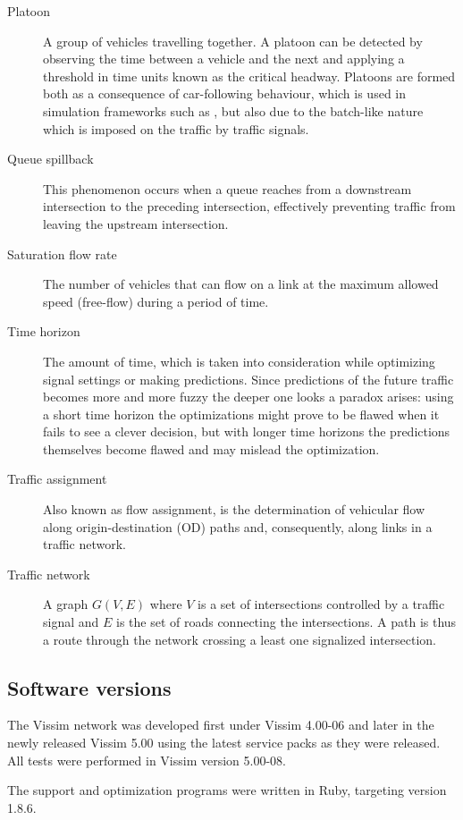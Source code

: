 \begin{description}
	\item[Platoon] A group of vehicles travelling together. A platoon can be detected by observing the time between a vehicle and the next and applying a threshold in time units known as the critical headway.
Platoons are formed both as a consequence of car-following behaviour, which is used in simulation frameworks such as \cite{treiber-2000-62}, but also due to the batch-like nature which is imposed on the traffic by traffic signals.

\item[Queue spillback] This phenomenon occurs when a queue reaches from a downstream intersection to the preceding intersection, effectively preventing traffic from leaving the upstream intersection.

\item[Saturation flow rate] The number of vehicles that can flow on a link at the maximum allowed speed (free-flow) during a period of time.

\item[Time horizon] The amount of time, which is taken into consideration while optimizing signal settings or making predictions. Since predictions of the future traffic becomes more and more fuzzy the deeper one looks a paradox arises: using a short time horizon the optimizations might prove to be flawed when it fails to see a clever decision, but with longer time horizons the predictions themselves become flawed and may mislead the optimization.

\item[Traffic assignment] Also known as flow assignment, is the determination of vehicular flow along origin-destination (OD) paths and, consequently, along links in a traffic network. 

\item[Traffic network] A graph $G(V,E)$ where $V$ is a set of intersections controlled by a traffic signal and $E$ is the set of roads connecting the intersections. A path is thus a route through the network crossing a least one signalized intersection.

\end{description}

\subsection{Software versions}
The Vissim network was developed first under Vissim 4.00-06 and later in the newly released Vissim 5.00 using the latest service packs as they were released. All tests were performed in Vissim version 5.00-08. 

The support and optimization programs were written in Ruby, targeting version 1.8.6.
